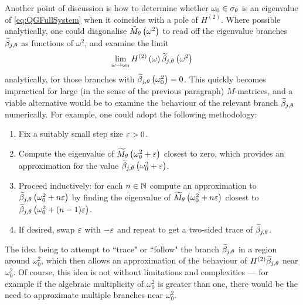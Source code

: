 Another point of discussion is how to determine whether $\omega_0\in\sigma_\theta$ is an eigenvalue of \eqref{eq:QGFullSystem} when it coincides with a pole of $H^{(2)}$.
Where possible analytically, one could diagonalise $\tilde{M}_\theta\left( \omega^2 \right)$ to read off the eigenvalue branches $\widetilde{\beta}_{j,\theta}$ as functions of $\omega^2$, and examine the limit
\begin{align*}
	\lim_{\omega\rightarrow\omega_0}H^{(2)}\left( \omega \right)\widetilde{\beta}_{j,\theta}\left( \omega^2 \right)
\end{align*}
analytically, for those branches with $\widetilde{\beta}_{j,\theta}\left( \omega_0^2 \right)=0$.
This quickly becomes impractical for large (in the sense of the previous paragraph) $M$-matrices, and a viable alternative would be to examine the behaviour of the relevant branch $\widetilde{\beta}_{j,\theta}$ numerically.
For example, one could adopt the following methodology:
\begin{enumerate}
	\item Fix a suitably small step size $\varepsilon>0$.
	\item Compute the eigenvalue of $\widetilde{M}_\theta\left( \omega_0^2+\varepsilon \right)$ closest to zero, which provides an approximation for the value $\widetilde{\beta}_{j,\theta}\left( \omega_0^2+\varepsilon \right)$.
	\item Proceed inductively: for each $n\in\mathbb{N}$ compute an approximation to $\widetilde{\beta}_{j,\theta}\left( \omega_0^2+n\varepsilon \right)$ by finding the eigenvalue of $\widetilde{M}_\theta\left( \omega_0^2+n\varepsilon \right)$ closest to $\widetilde{\beta}_{j,\theta}\left( \omega_0^2+(n-1)\varepsilon \right)$.
	\item If desired, swap $\varepsilon$ with $-\varepsilon$ and repeat to get a two-sided trace of $\widetilde{\beta}_{j,\theta}$.
\end{enumerate}
The idea being to attempt to ``trace" or ``follow" the branch $\widetilde{\beta}_{j,\theta}$ in a region around $\omega_0^2$, which then allows an approximation of the behaviour of $H^{(2)}\widetilde{\beta}_{j,\theta}$ near $\omega_0^2$.
Of course, this idea is not without limitations and complexities --- for example if the algebraic multiplicity of $\omega_0^2$ is greater than one, there would be the need to approximate multiple branches near $\omega_0^2$.

